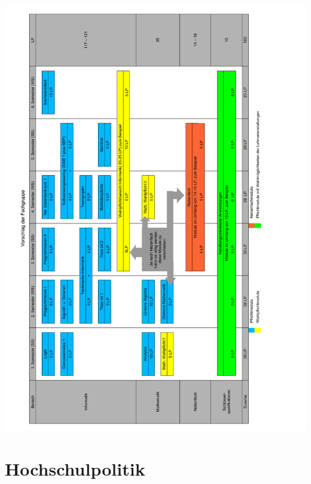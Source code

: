 \documentclass[]{papertex}
\begin{document}
		\begin{minipage}{1.0\linewidth}
		\begin{center} 
  			\includegraphics[totalheight=\textheight, width=\textwidth ]{bilder/studienplan_bsc_ss/FG_Vorschlag_BeginSS}
  			\label{studienplan_neu}
		\end{center}
		\end{minipage}
	
	
	\newpage
	\section{Hochschulpolitik}
		\label{politik}
		\begin{multicols}{2}
		
		
		\end{multicols}
	\newpage
\end{document}
